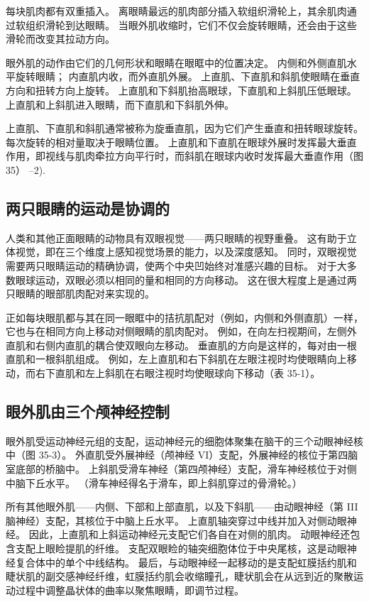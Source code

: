 每块肌肉都有双重插入。 离眼睛最远的肌肉部分插入软组织滑轮上，其余肌肉通过软组织滑轮到达眼睛。 当眼外肌收缩时，它们不仅会旋转眼睛，还会由于这些滑轮而改变其拉动方向。

眼外肌的动作由它们的几何形状和眼睛在眼眶中的位置决定。 内侧和外侧直肌水平旋转眼睛； 内直肌内收，而外直肌外展。 上直肌、下直肌和斜肌使眼睛在垂直方向和扭转方向上旋转。 上直肌和下斜肌抬高眼球，下直肌和上斜肌压低眼球。 上直肌和上斜肌进入眼睛，而下直肌和下斜肌外伸。

上直肌、下直肌和斜肌通常被称为旋垂直肌，因为它们产生垂直和扭转眼球旋转。 每次旋转的相对量取决于眼睛位置。 上直肌和下直肌在眼球外展时发挥最大垂直作用，即视线与肌肉牵拉方向平行时，而斜肌在眼球内收时发挥最大垂直作用（图 35） –2).



\subsection{两只眼睛的运动是协调的}
人类和其他正面眼睛的动物具有双眼视觉——两只眼睛的视野重叠。 这有助于立体视觉，即在三个维度上感知视觉场景的能力，以及深度感知。 同时，双眼视觉需要两只眼睛运动的精确协调，使两个中央凹始终对准感兴趣的目标。 对于大多数眼球运动，双眼必须以相同的量和相同的方向移动。 这在很大程度上是通过两只眼睛的眼部肌肉配对来实现的。

正如每块眼肌都与其在同一眼眶中的拮抗肌配对（例如，内侧和外侧直肌）一样，它也与在相同方向上移动对侧眼睛的肌肉配对。 例如，在向左扫视期间，左侧外直肌和右侧内直肌的耦合使双眼向左移动。 垂直肌的方向是这样的，每对由一根直肌和一根斜肌组成。 例如，左上直肌和右下斜肌在左眼注视时均使眼睛向上移动，而右下直肌和左上斜肌在右眼注视时均使眼球向下移动（表 35-1）。

\subsection{眼外肌由三个颅神经控制}

眼外肌受运动神经元组的支配，运动神经元的细胞体聚集在脑干的三个动眼神经核中（图 35-3）。 外直肌受外展神经（颅神经 VI）支配，外展神经的核位于第四脑室底部的桥脑中。 上斜肌受滑车神经（第四颅神经）支配，滑车神经核位于对侧中脑下丘水平。 （滑车神经得名于滑车，即上斜肌穿过的骨滑轮。）

所有其他眼外肌——内侧、下部和上部直肌，以及下斜肌——由动眼神经（第 III 脑神经）支配，其核位于中脑上丘水平。 上直肌轴突穿过中线并加入对侧动眼神经。 因此，上直肌和上斜运动神经元支配它们各自在对侧的肌肉。 动眼神经还包含支配上眼睑提肌的纤维。 支配双眼睑的轴突细胞体位于中央尾核，这是动眼神经复合体中的单个中线结构。 最后，与动眼神经一起移动的是支配虹膜括约肌和睫状肌的副交感神经纤维，虹膜括约肌会收缩瞳孔，睫状肌会在从远到近的聚散运动过程中调整晶状体的曲率以聚焦眼睛，即调节过程。

